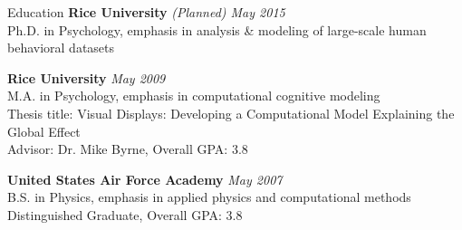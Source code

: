 
\begin{rSection}{Education}
  {\bf Rice University} \hfill {\em (Planned) May 2015} \\
  Ph.D. in Psychology, emphasis in analysis \& modeling of large-scale human behavioral datasets
\item {\bf Rice University} \hfill {\em May 2009} \\ 
  M.A. in Psychology, emphasis in computational cognitive modeling \\
  Thesis title: Visual Displays: Developing a Computational Model Explaining the Global Effect \\
  Advisor: Dr. Mike Byrne, Overall GPA: 3.8
\item {\bf United States Air Force Academy} \hfill {\em May 2007} \\ 
  B.S. in Physics, emphasis in applied physics and computational methods \\
  Distinguished Graduate, Overall GPA: 3.8 \\
\end{rSection}

